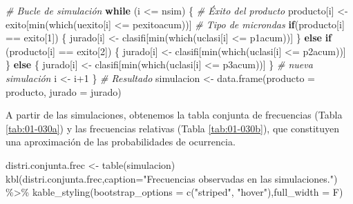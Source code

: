 \documentclass[
]{book}
\newenvironment{Shaded}{\begin{snugshade}}{\end{snugshade}}
\newcommand{\AttributeTok}[1]{\textcolor[rgb]{0.77,0.63,0.00}{#1}}
\newcommand{\CommentTok}[1]{\textcolor[rgb]{0.56,0.35,0.01}{\textit{#1}}}
\newcommand{\ControlFlowTok}[1]{\textcolor[rgb]{0.13,0.29,0.53}{\textbf{#1}}}
\newcommand{\DecValTok}[1]{\textcolor[rgb]{0.00,0.00,0.81}{#1}}
\newcommand{\FunctionTok}[1]{\textcolor[rgb]{0.00,0.00,0.00}{#1}}
\newcommand{\NormalTok}[1]{#1}
\newcommand{\OtherTok}[1]{\textcolor[rgb]{0.56,0.35,0.01}{#1}}
\newcommand{\SpecialCharTok}[1]{\textcolor[rgb]{0.00,0.00,0.00}{#1}}
\newcommand{\StringTok}[1]{\textcolor[rgb]{0.31,0.60,0.02}{#1}}
\theoremstyle{definition}
\theoremstyle{definition}
\theoremstyle{definition}
\theoremstyle{definition}
\theoremstyle{remark}
\begin{document}
\begin{Shaded}
\begin{Highlighting}[]
\CommentTok{\# Bucle de simulación}
\ControlFlowTok{while}\NormalTok{ (i }\SpecialCharTok{\textless{}=}\NormalTok{ nsim)}
\NormalTok{\{}
  \CommentTok{\# Éxito del producto}
\NormalTok{  producto[i] }\OtherTok{\textless{}{-}}\NormalTok{ exito[}\FunctionTok{min}\NormalTok{(}\FunctionTok{which}\NormalTok{(uexito[i] }\SpecialCharTok{\textless{}=}\NormalTok{ pexitoacum))]}
  \CommentTok{\# Tipo de microndas}
  \ControlFlowTok{if}\NormalTok{(producto[i] }\SpecialCharTok{==}\NormalTok{ exito[}\DecValTok{1}\NormalTok{])}
\NormalTok{  \{}
\NormalTok{    jurado[i] }\OtherTok{\textless{}{-}}\NormalTok{ clasifi[}\FunctionTok{min}\NormalTok{(}\FunctionTok{which}\NormalTok{(uclasi[i] }\SpecialCharTok{\textless{}=}\NormalTok{ p1acum))]}
\NormalTok{  \}}
  \ControlFlowTok{else} \ControlFlowTok{if}\NormalTok{ (producto[i] }\SpecialCharTok{==}\NormalTok{ exito[}\DecValTok{2}\NormalTok{])}
\NormalTok{  \{}
\NormalTok{    jurado[i] }\OtherTok{\textless{}{-}}\NormalTok{ clasifi[}\FunctionTok{min}\NormalTok{(}\FunctionTok{which}\NormalTok{(uclasi[i] }\SpecialCharTok{\textless{}=}\NormalTok{ p2acum))]}
\NormalTok{  \}}
  \ControlFlowTok{else}
\NormalTok{  \{}
\NormalTok{    jurado[i] }\OtherTok{\textless{}{-}}\NormalTok{ clasifi[}\FunctionTok{min}\NormalTok{(}\FunctionTok{which}\NormalTok{(uclasi[i] }\SpecialCharTok{\textless{}=}\NormalTok{ p3acum))]    }
\NormalTok{  \}}
  \CommentTok{\# nueva simulación}
\NormalTok{  i }\OtherTok{\textless{}{-}}\NormalTok{ i}\SpecialCharTok{+}\DecValTok{1}
\NormalTok{\}}
\CommentTok{\# Resultado}
\NormalTok{simulacion }\OtherTok{\textless{}{-}} \FunctionTok{data.frame}\NormalTok{(}\AttributeTok{producto =}\NormalTok{ producto, }\AttributeTok{jurado =}\NormalTok{ jurado)}
\end{Highlighting}
\end{Shaded}

A partir de las simulaciones, obtenemos la tabla conjunta de frecuencias (Tabla \ref{tab:01-030a}) y las frecuencias relativas (Tabla \ref{tab:01-030b}), que constituyen una aproximación de las probabilidades de ocurrencia.

\begin{Shaded}
\begin{Highlighting}[]
\NormalTok{distri.conjunta.frec }\OtherTok{\textless{}{-}} \FunctionTok{table}\NormalTok{(simulacion)}
\FunctionTok{kbl}\NormalTok{(distri.conjunta.frec,}\AttributeTok{caption=}\StringTok{"Frecuencias observadas en las simulaciones."}\NormalTok{) }\SpecialCharTok{\%\textgreater{}\%}
  \FunctionTok{kable\_styling}\NormalTok{(}\AttributeTok{bootstrap\_options =} \FunctionTok{c}\NormalTok{(}\StringTok{"striped"}\NormalTok{, }\StringTok{"hover"}\NormalTok{),}\AttributeTok{full\_width =}\NormalTok{ F)}
\end{Highlighting}
\end{Shaded}
\end{document}
